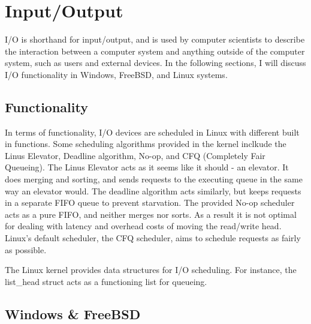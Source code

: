 \documentclass[journal, letterpaper, draftclsnofoot, onecolumn, 10pt]{journal}
\begin{document}
\section{Input/Output}

I/O is shorthand for input/output, and is used by computer scientists to describe the interaction between a computer system and anything outside of the computer system, such as users and external devices.
In the following sections, I will discuss I/O functionality in Windows, FreeBSD, and Linux systems.

\subsection{Functionality}

In terms of functionality, I/O devices are scheduled in Linux with different built in functions. Some scheduling algorithms provided in the kernel inclkude the Linus Elevator, Deadline algorithm, No-op, and CFQ (Completely Fair Queueing).
The Linus Elevator acts as it seems like it should - an elevator. It does merging and sorting, and sends requests to the executing queue in the same way an elevator would. The deadline algorithm acts similarly, but keeps requests in a separate FIFO queue to
prevent starvation. The provided No-op scheduler acts as a pure FIFO, and neither merges nor sorts. As a result it is not optimal for dealing with latency and overhead costs of moving the read/write head. Linux's default scheduler, the CFQ scheduler, aims to schedule requests as fairly as possible.

The Linux kernel provides data structures for I/O scheduling. For instance, the list\_head struct acts as a functioning list for queueing.

\subsection{Windows & FreeBSD}



\FloatBarrier
\end{document}

